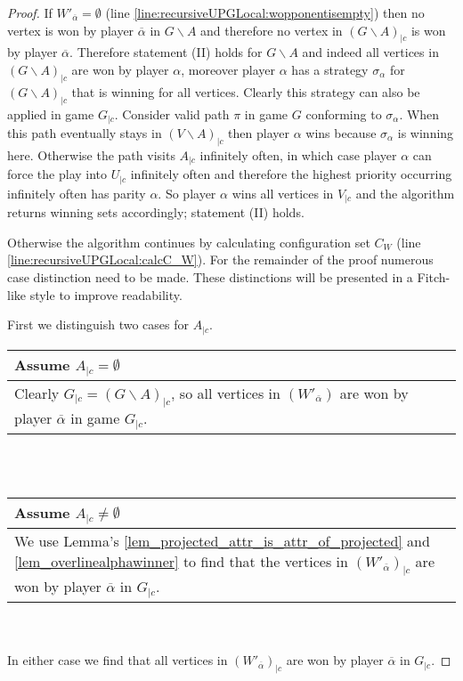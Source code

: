 \begin{theorem}
\begin{proof}
		If $W'_{\overline{\alpha}} = \emptyset$ (line \ref{line:recursiveUPGLocal:wopponentisempty}) then no vertex is won by player $\overline{\alpha}$ in $G\backslash A$ and therefore no vertex in $(G\backslash A)_{|c}$ is won by player $\overline{\alpha}$. Therefore statement (II) holds for $G\backslash A$ and indeed all vertices in $(G\backslash A)_{|c}$ are won by player $\alpha$, moreover player $\alpha$ has a strategy $\sigma_\alpha$ for $(G\backslash A)_{|c}$ that is winning for all vertices. Clearly this strategy can also be applied in game $G_{|c}$. Consider valid path $\pi$ in game $G$ conforming to $\sigma_\alpha$. When this path eventually stays in $(V \backslash A)_{|c}$ then player $\alpha$ wins because $\sigma_\alpha$ is winning here. Otherwise the path visits $A_{|c}$ infinitely often, in which case player $\alpha$ can force the play into $U_{|c}$ infinitely often and therefore the highest priority occurring infinitely often has parity $\alpha$. So player $\alpha$ wins all vertices in $V_{|c}$ and the algorithm returns winning sets accordingly; statement (II) holds.
		
		Otherwise the algorithm continues by calculating configuration set $C_W$ (line \ref{line:recursiveUPGLocal:calcC_W}). For the remainder of the proof numerous case distinction need to be made. These distinctions will be presented in a Fitch-like style to improve readability.
		
		First we distinguish two cases for $A_{|c}$.
		
		\begin{tabular}{|p{14.2cm}}
			Assume $A_{|c} = \emptyset$\\
			\hline
			Clearly $G_{|c} = (G\backslash A)_{|c}$, so all vertices in $(W'_{\overline{\alpha}})$ are won by player $\overline{\alpha}$ in game $G_{|c}$.
		\end{tabular}\\\\
		\begin{tabular}{|p{14.2cm}}
			Assume $A_{|c} \neq \emptyset$\\
			\hline
			We use Lemma's \ref{lem_projected_attr_is_attr_of_projected} and \ref{lem_overlinealphawinner} to find that the vertices in $(W'_{\overline{\alpha}})_{|c}$ are won by player $\overline{\alpha}$ in $G_{|c}$.
		\end{tabular}\\\\
		In either case we find that all vertices in $(W'_{\overline{\alpha}})_{|c}$ are won by player $\overline{\alpha}$ in $G_{|c}$.
		

\end{proof}
\end{theorem}
